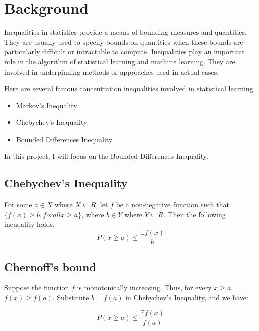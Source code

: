 

\section{Background}

Inequalities in statistics provide a means of bounding measures and quantities. 
They are usually used to specify bounds on quantities when these bounds are particularly difficult or intractable to compute.
Inequalities play an important role in the algorithm of statistical learning and machine learning. 
They are involved in underpinning methods or approaches used in actual cases.

Here are several famous concentration inequalities involved in statistical learning. 
\begin{itemize}
  \item Markov's Inequality
  \item Chebychev's Inequality 
  \item Bounded Differences Inequality 
\end{itemize}

In this project, I will focus on the Bounded Differences Inequality.

\subsection{Chebychev's Inequality}
\begin{theorem} 
  For some $a \in X$ where $X \subseteq R$, let $f$ be a non-negative function such that
  $\{ f(x) \geq b, for all x \geq a\}$, where $b \in Y$ where $Y \subseteq R$. Then the following ineuqality holds,
  \begin{equation}
    P(x \geq a) \leq \frac{\mathbb{E}f(x)}{b}
  \end{equation}
\end{theorem}

\subsection{Chernoff's bound}
Suppose the function $f$ is monotonically increasing.
Thus, for every $x \geq a$, $f(x) \geq f(a)$. 
Substitute $b = f(a)$ in Chebychev's Inequality, and we have:

\begin{equation}
  P(x \geq a) \leq \frac{\mathbb{E}f(x)}{f(a)}
\end{equation}


